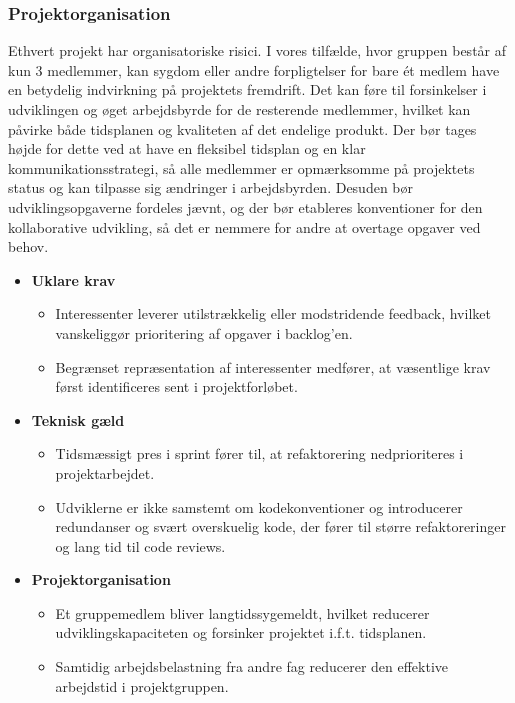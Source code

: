 \subsubsection{Projektorganisation}
Ethvert projekt har organisatoriske risici. I vores tilfælde, hvor gruppen består af kun 3 medlemmer, kan sygdom eller andre forpligtelser for bare ét medlem have en betydelig indvirkning på projektets fremdrift.
Det kan føre til forsinkelser i udviklingen og øget arbejdsbyrde for de resterende medlemmer, hvilket kan påvirke både tidsplanen og kvaliteten af det endelige produkt.
Der bør tages højde for dette ved at have en fleksibel tidsplan og en klar kommunikationsstrategi, så alle medlemmer er opmærksomme på projektets status og kan tilpasse sig ændringer i arbejdsbyrden.
Desuden bør udviklingsopgaverne fordeles jævnt, og der bør etableres konventioner for den kollaborative udvikling, så det er nemmere for andre at overtage opgaver ved behov.

\begin{itemize}
    \item \textbf{Uklare krav}
    \begin{itemize}
        \item[R1] Interessenter leverer utilstrækkelig eller modstridende feedback, hvilket vanskeliggør prioritering af opgaver i backlog'en.
        \item[R2] Begrænset repræsentation af interessenter medfører, at væsentlige krav først identificeres sent i projektforløbet.
    \end{itemize}

    \item \textbf{Teknisk gæld}
    \begin{itemize}
        \item[R3] Tidsmæssigt pres i sprint fører til, at refaktorering nedprioriteres i projektarbejdet.
        \item[R4] Udviklerne er ikke samstemt om kodekonventioner og introducerer redundanser og svært overskuelig kode, der fører til større refaktoreringer og lang tid til code reviews.
    \end{itemize}


    \item \textbf{Projektorganisation}
    \begin{itemize}
        \item[R5] Et gruppemedlem bliver langtidssygemeldt, hvilket reducerer udviklingskapaciteten og forsinker projektet i.f.t. tidsplanen.
        \item[R6] Samtidig arbejdsbelastning fra andre fag reducerer den effektive arbejdstid i projektgruppen.
    \end{itemize}
\end{itemize}

